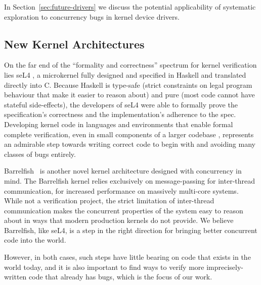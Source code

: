 
In Section~\ref{sec:future-drivers} we discuss the potential applicability of systematic exploration to concurrency bugs in kernel device drivers.

\subsection{New Kernel Architectures}

On the far end of the ``formality and correctness'' spectrum for kernel verification lies seL4 \cite{sel4}, a microkernel fully designed and specified in Haskell and translated directly into C. Because Haskell is type-safe (strict constraints on legal program behaviour that make it easier to reason about) and pure (most code cannot have stateful side-effects), the developers of seL4 were able to formally prove the specification's correctness and the implementation's adherence to the spec.
Developing kernel code in languages and environments that enable formal complete verification, even in small components of a larger codebase , represents an admirable step towards writing correct code to begin with and avoiding many classes of bugs entirely.

Barrelfish~\cite{barrelfish} is another novel kernel architecture designed with concurrency in mind. The Barrelfish kernel relies exclusively on message-passing for inter-thread communication, for increased performance on massively multi-core systems. While not a verification project, the strict limitation of inter-thread communication makes the concurrent properties of the system easy to reason about in ways that modern production kernels do not provide.
We believe Barrelfish, like seL4, is a step in the right direction for bringing better concurrent code into the world.

However, in both cases, such steps have little bearing on code that exists in the world today, and it is also important to find ways to verify more imprecisely-written code that already has bugs, which is the focus of our work.

